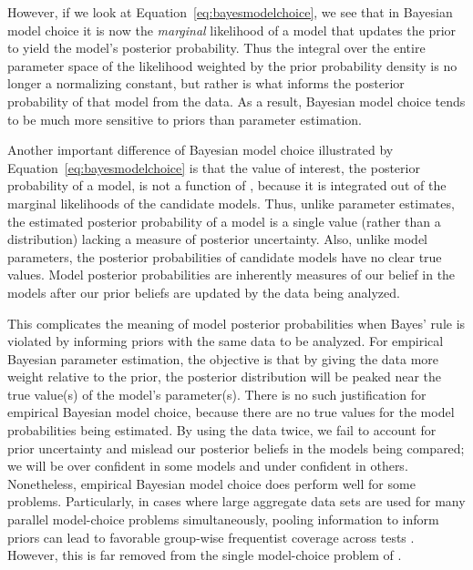 
However, if we look at Equation~\ref{eq:bayesmodelchoice}, we see that in
Bayesian model choice it is now the \emph{marginal} likelihood of a model that
updates the prior to yield the model's posterior probability.
Thus the integral over the entire parameter space of the likelihood weighted by
the prior probability density is no longer a normalizing constant, but rather
is what informs the posterior probability of that model from the data.
As a result, Bayesian model choice tends to be much more sensitive to priors
than parameter estimation.

Another important difference of Bayesian model choice illustrated by
Equation~\ref{eq:bayesmodelchoice} is that the value of interest, the
posterior probability of a model, is not a function of \myTheta{}, because
it is integrated out of the marginal likelihoods of the candidate models.
Thus, unlike parameter estimates, the estimated posterior probability of a
model is a single value (rather than a distribution) lacking a measure of
posterior uncertainty.
Also, unlike model parameters, the posterior probabilities of candidate
models have no clear true values.
Model posterior probabilities are inherently measures of our belief in the
models after our prior beliefs are updated by the data being analyzed.

This complicates the meaning of model posterior probabilities when Bayes' rule
is violated by informing priors with the same data to be analyzed.
For empirical Bayesian parameter estimation, the objective is that by giving the
data more weight relative to the prior, the posterior distribution will be
peaked near the true value(s) of the model's parameter(s).
There is no such justification for empirical Bayesian model choice, because
there are no true values for the model probabilities being estimated.
By using the data twice, we fail to account for prior uncertainty and mislead
our posterior beliefs in the models being compared; we will be over confident
in some models and under confident in others.
Nonetheless, empirical Bayesian model choice does perform well for some
problems.
Particularly, in cases where large aggregate data sets are used for many
parallel model-choice problems simultaneously, pooling information to inform
priors can lead to favorable group-wise frequentist coverage across tests
\citep{Efron2008}.
However, this is far removed from the single model-choice problem of \msb.

